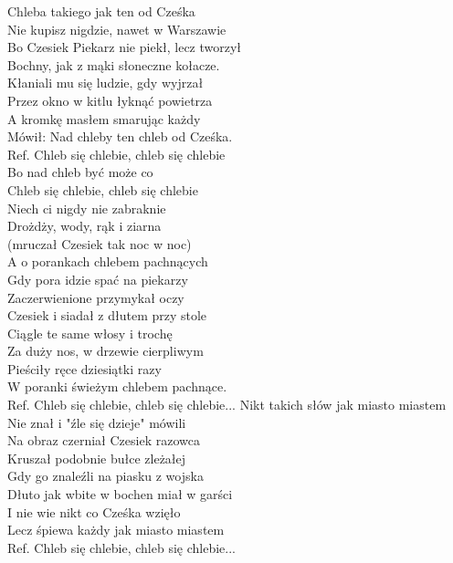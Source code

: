 
Chleba takiego jak ten od Cześka \\
Nie kupisz nigdzie, nawet w Warszawie \\
Bo Czesiek Piekarz nie piekł, lecz tworzył \\
Bochny, jak z mąki słoneczne kołacze. \\
\hop
Kłaniali mu się ludzie, gdy wyjrzał \\
Przez okno w kitlu łyknąć powietrza \\
A kromkę masłem smarując każdy \\
Mówił: Nad chleby ten chleb od Cześka. \\
\hops
Ref. Chleb się chlebie, chleb się chlebie \\
 Bo nad chleb być może co \\
 Chleb się chlebie, chleb się chlebie \\
 Niech ci nigdy nie zabraknie \\
 Drożdży, wody, rąk i ziarna \\
 (mruczał Czesiek tak noc w noc) \\
\hops
A o porankach chlebem pachnących\\
Gdy pora idzie spać na piekarzy\\
Zaczerwienione przymykał oczy\\
Czesiek i siadał z dłutem przy stole\\
\hop
Ciągle te same włosy i trochę\\
Za duży nos, w drzewie cierpliwym\\
Pieściły ręce dziesiątki razy\\
W poranki świeżym chlebem pachnące.\\
\hops
Ref. Chleb się chlebie, chleb się chlebie...
\hops
Nikt takich słów jak miasto miastem\\
Nie znał i "źle się dzieje" mówili\\
Na obraz czerniał Czesiek razowca\\
Kruszał podobnie bułce zleżałej\\
\hop
Gdy go znaleźli na piasku z wojska\\
Dłuto jak wbite w bochen miał w garści\\
I  nie wie nikt co Cześka wzięło\\
Lecz śpiewa każdy jak miasto miastem\\
\hops
Ref. Chleb się chlebie, chleb się chlebie...